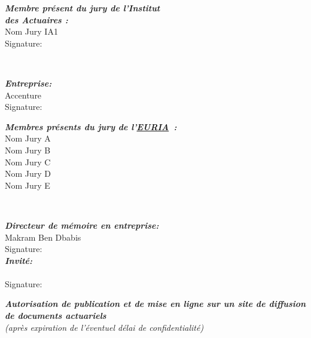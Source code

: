 \documentclass[a4paper,11pt,twoside] {book}
\newcommand{\euria}{\href{http://www.univ-brest.fr/index.php?page=affiche_composante&object=euria}{EURIA}\xspace}
\def\NomJuryIA{Nom Jury IA1}
\def\NomJuryA{Nom Jury A}
\def\NomJuryB{Nom Jury B}
\def\NomJuryC{Nom Jury C}
\def\NomJuryD{Nom Jury D}
\def\NomJuryE{Nom Jury E}
\def\TitreAdjust{4.6mm} 				%
\def\entreprise{Accenture}
\def\directeurmemoire{Makram Ben Dbabis}
\def\invite{}
\begin{document}
\begin{titlepage}
\vspace{\TitreAdjust}
\begin{minipage}[c][2.5cm][t]{0.50\textwidth}
\textit{\textbf{Membre présent du jury de l'Institut\\
des Actuaires :}}\\
\NomJuryIA \\
Signature:
\end{minipage}
~%
\begin{minipage}[c][2.5cm][t]{0.46\textwidth}
\textit{\textbf{Entreprise:}}\\
\entreprise \\
Signature:
\end{minipage}

\vspace{\TitreAdjust}
\begin{minipage}[t][4cm][t]{0.50\textwidth}
\textbf{\textit{Membres présents du jury de l'\euria~:}}\\
\NomJuryA\\
\NomJuryB\\
\NomJuryC\\
\NomJuryD\\
\NomJuryE\\
\end{minipage}
~%
\begin{minipage}[t][4cm][t]{0.46\textwidth}
\textbf{\textit{Directeur de mémoire en entreprise:}}\\
\directeurmemoire\\
Signature:\\

\textit{\textbf{Invité:}}\\
\invite\\
Signature:
\end{minipage}
\vspace{\TitreAdjust}


\begin{minipage}[c][1.5cm][c]{1\linewidth}
\begin{center}
\textit{\textbf{Autorisation de publication et de mise en ligne sur un site de diffusion de documents actuariels }\\
 (après expiration de l'éventuel délai de confidentialité)}
\end{center}
\end{minipage}
\vspace{\TitreAdjust}


\end{titlepage}
\end{document}
